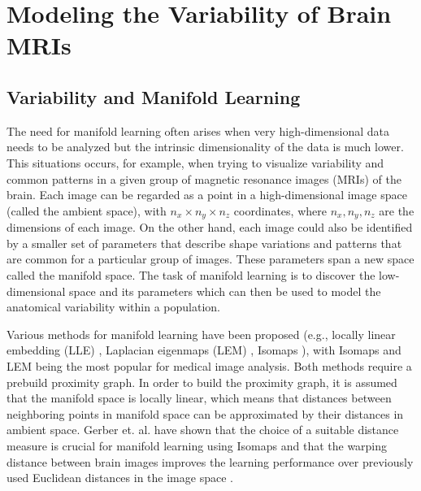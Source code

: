 \chapter{Modeling the Variability of Brain MRIs}

\section{Variability and Manifold Learning}


The need for manifold learning often arises when very high-dimensional data
needs to be analyzed but the intrinsic dimensionality of the data is much lower.
This situations occurs, for example, when trying to visualize variability and
common patterns in a given group of magnetic resonance images (MRIs) of the
brain. Each image can be regarded as a point in a high-dimensional image space
(called the ambient space), with $n_x \times n_y \times n_z$ coordinates, where
$n_x, n_y, n_z$ are the dimensions of each image. On the other hand, each image
could also be identified by a smaller set of parameters that describe shape
variations and patterns that are common for a particular group of images. These
parameters span a new space called the manifold space. The task of manifold
learning is to discover the low-dimensional space and its parameters which can
then be used to model the anatomical variability within a population.

Various methods for manifold learning have been proposed (e.g., locally linear
embedding (LLE) \citep{saul2003}, Laplacian eigenmaps (LEM) \citep{belkin2002},
Isomaps \citep{tenenbaum2000}), with Isomaps and LEM being the most popular for
medical image analysis. Both methods require a prebuild proximity graph. In
order to build the proximity graph, it is assumed that the manifold space is
locally linear, which means that distances between neighboring points in
manifold space can be approximated by their distances in ambient space. Gerber
et. al. have shown that the choice of a suitable distance measure is crucial
for manifold learning using Isomaps and that the warping distance between brain images
improves the learning performance over previously used Euclidean distances in
the image space \citep{gerber2010}.

